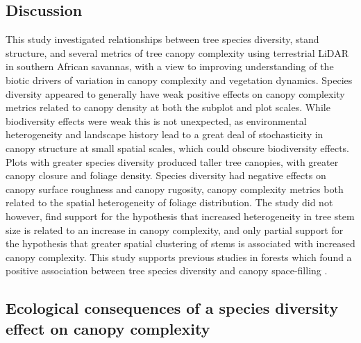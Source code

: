 \begin{refsection}
\section{Discussion}
\label{tls:sec:discussion}

This study investigated relationships between tree species diversity, stand structure, and several metrics of tree canopy complexity using terrestrial LiDAR in southern African savannas, with a view to improving understanding of the biotic drivers of variation in canopy complexity and vegetation dynamics. Species diversity appeared to generally have weak positive effects on canopy complexity metrics related to canopy density at both the subplot and plot scales. While biodiversity effects were weak this is not unexpected, as environmental heterogeneity and landscape history lead to a great deal of stochasticity in canopy structure at small spatial scales, which could obscure biodiversity effects. Plots with greater species diversity produced taller tree canopies, with greater canopy closure and foliage density. Species diversity had negative effects on canopy surface roughness and canopy rugosity, canopy complexity metrics both related to the spatial heterogeneity of foliage distribution. The study did not however, find support for the hypothesis that increased heterogeneity in tree stem size is related to an increase in canopy complexity, and only partial support for the hypothesis that greater spatial clustering of stems is associated with increased canopy complexity. This study supports previous studies in forests which found a positive association between tree species diversity and canopy space-filling \citep{Seidel2013, Shirima2015b}.

\subsection{Ecological consequences of a species diversity effect on canopy complexity}
\label{tls:ssec:ecology}


\end{refsection}
